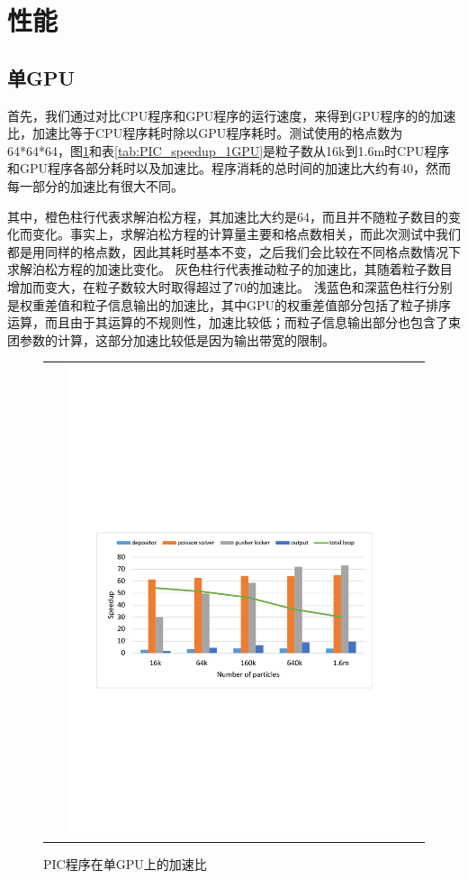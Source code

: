 \section{性能}

\subsection{单GPU}
首先，我们通过对比CPU程序和GPU程序的运行速度，来得到GPU程序的的加速比，加速比等于CPU程序耗时除以GPU程序耗时。测试使用的格点数为64*64*64，图\ref{fig:PIC_speedup_1GPU}和表\ref{tab:PIC_speedup_1GPU}是粒子数从16k到1.6m时CPU程序和GPU程序各部分耗时以及加速比。程序消耗的总时间的加速比大约有40，然而每一部分的加速比有很大不同。

其中，橙色柱行代表求解泊松方程，其加速比大约是64，而且并不随粒子数目的变化而变化。事实上，求解泊松方程的计算量主要和格点数相关，而此次测试中我们都是用同样的格点数，因此其耗时基本不变，之后我们会比较在不同格点数情况下求解泊松方程的加速比变化。
灰色柱行代表推动粒子的加速比，其随着粒子数目增加而变大，在粒子数较大时取得超过了70的加速比。
浅蓝色和深蓝色柱行分别是权重差值和粒子信息输出的加速比，其中GPU的权重差值部分包括了粒子排序运算，而且由于其运算的不规则性，加速比较低；而粒子信息输出部分也包含了束团参数的计算，这部分加速比较低是因为输出带宽的限制。


\begin{figure}[!htb]
  \centering
  \begin{tabular}{|l|l|}
    \multicolumn{2}{c}{
    \includegraphics[width=0.9\textwidth]{Img/PIC_speedup_1GPU.pdf}} \\
  \end{tabular}
  \caption{PIC程序在单GPU上的加速比}
  \label{fig:PIC_speedup_1GPU}
\end{figure}

